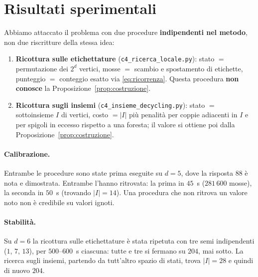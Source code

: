 \documentclass[11pt,a4paper]{article}
\theoremstyle{plain}
\theoremstyle{definition}
\begin{document}
\section{Risultati sperimentali}

Abbiamo attaccato il problema con due procedure \textbf{indipendenti nel metodo},
non due riscritture della stessa idea:

\begin{enumerate}
\item \textbf{Ricottura sulle etichettature} (\texttt{c4\_ricerca\_locale.py}):
stato $=$ permutazione dei $2^d$ vertici, mosse $=$ scambio e spostamento di
etichette, punteggio $=$ conteggio esatto via \eqref{eq:ricorrenza}. Questa
procedura \textbf{non conosce} la Proposizione~\ref{prop:costruzione}.
\item \textbf{Ricottura sugli insiemi} (\texttt{c4\_insieme\_decycling.py}):
stato $=$ sottoinsieme $I$ di vertici, costo $=|I|$ più penalità per coppie
adiacenti in $I$ e per spigoli in eccesso rispetto a una foresta; il valore si
ottiene poi dalla Proposizione~\ref{prop:costruzione}.
\end{enumerate}

\paragraph{Calibrazione.} Entrambe le procedure sono state prima eseguite su
$d=5$, dove la risposta $88$ è nota e dimostrata. Entrambe l'hanno ritrovata: la
prima in $45$~s ($281\,600$ mosse), la seconda in $50$~s (trovando $|I|=14$).
Una procedura che non ritrova un valore noto non è credibile su valori ignoti.

\paragraph{Stabilità.} Su $d=6$ la ricottura sulle etichettature è stata
ripetuta con tre semi indipendenti ($1$, $7$, $13$), per $500$--$600$~s
ciascuna: tutte e tre si fermano su $204$, mai sotto. La ricerca sugli insiemi,
partendo da tutt'altro spazio di stati, trova $|I|=28$ e quindi di nuovo $204$.
\end{document}
